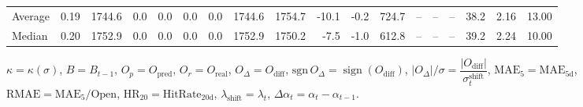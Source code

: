 \begin{threeparttable}
{\begin{tabular}{lrrrrrrrrrrrrrrrrr}
Average &     0.19 & 1744.6 &               0.0 &               0.0 &                0.0 &                0.0 & 1744.6 & 1754.7 &      -10.1 &                     -0.2 &               724.7 &         -- &        -- &             -- &             38.2 &            2.16 &                  13.00 \\
 Median &     0.20 & 1752.9 &               0.0 &               0.0 &                0.0 &                0.0 & 1752.9 & 1750.2 &       -7.5 &                     -1.0 &               612.8 &         -- &        -- &             -- &             39.2 &            2.24 &                  10.00 \\
\bottomrule
\end{tabular}
}
\begin{tablenotes}\footnotesize
\item $\kappa=\kappa(\sigma)$, $B=B_{t-1}$, $O_p=O_{\text{pred}}$, $O_r=O_{\text{real}}$, $O_\Delta=O_{\text{diff}}$, $\mathrm{sgn}\,O_\Delta=\operatorname{sign}(O_{\text{diff}})$, $|O_\Delta|/\sigma=\dfrac{|O_{\text{diff}}|}{\sigma_t^{\text{shift}}}$, $\mathrm{MAE}_5=\mathrm{MAE}_{5\text{d}}$, $\mathrm{RMAE}= \mathrm{MAE}_5 / \text{Open}$, $\mathrm{HR}_{20}=\mathrm{HitRate}_{20\text{d}}$, 
$\lambda_{\text{shift}}=\lambda_t$, 
$\Delta\alpha_t=\alpha_t-\alpha_{t-1}$.
\end{tablenotes}
\end{threeparttable}
\endgroup

